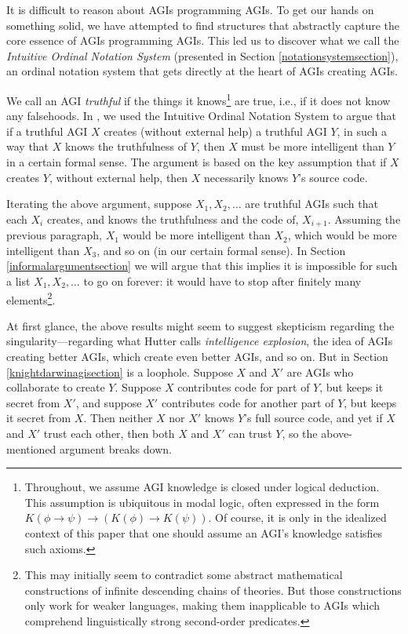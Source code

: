 \documentclass[runningheads]{llncs}
\begin{document}
It is difficult to reason about AGIs programming AGIs. To get our hands on something solid,
we have attempted to find structures that abstractly capture the core essence of
AGIs programming AGIs. This led us to discover
what we call the \emph{Intuitive Ordinal Notation System} (presented in Section
\ref{notationsystemsection}), an ordinal notation system that gets directly at
the heart of AGIs creating AGIs.

We call an AGI \emph{truthful} if the things it knows\footnote{Throughout, we assume
AGI knowledge is closed under logical
deduction. This assumption is ubiquitous in modal logic, often expressed in
the form
$K(\phi\rightarrow\psi)\rightarrow (K(\phi)\rightarrow K(\psi))$. Of course,
it is only in the idealized context of this paper that one should assume an AGI's
knowledge satisfies such axioms.}
are true,
i.e., if it does not know any falsehoods.
In \cite{alexander2019measuring}, we used the Intuitive Ordinal Notation System to argue
that if a truthful AGI $X$ creates (without external help) a truthful AGI $Y$, in such a way
that $X$ knows the truthfulness
of $Y$, then $X$ must be more intelligent than $Y$
in a certain formal sense. The argument is based on the key assumption that if $X$
creates $Y$, without external help, then $X$ necessarily knows $Y$'s source code.

Iterating the above argument, suppose $X_1,X_2,\ldots$
are truthful AGIs such that each $X_i$ creates, and knows the truthfulness and
the code of, $X_{i+1}$. Assuming the previous paragraph, $X_1$ would be more
intelligent than $X_2$, which would be more
intelligent than $X_3$, and so on (in our certain formal sense).
In Section \ref{informalargumentsection} we will argue that this implies
it is impossible for such
a list $X_1,X_2,\ldots$ to go on forever: it would have to stop after finitely
many elements\footnote{This may initially seem to contradict some abstract mathematical
constructions \cite{kripke2019ungroundedness}
\cite{visser2002semantics} of infinite descending chains of theories. But those
constructions only work for weaker languages, making them inapplicable to
AGIs which comprehend
linguistically strong second-order predicates.}.

At first glance, the above results might
seem to suggest skepticism regarding the singularity---regarding
what Hutter \cite{hutter2012} calls \emph{intelligence explosion}, the idea of
AGIs creating better AGIs, which create even better AGIs, and so on.
But in Section \ref{knightdarwinagisection} is a loophole. Suppose $X$ and $X'$ are AGIs
who collaborate to create $Y$. Suppose $X$ contributes code for
part of $Y$, but keeps it secret from $X'$, and suppose $X'$ contributes
code for another part of $Y$, but keeps it secret from $X$. Then neither
$X$ nor $X'$ knows $Y$'s full source code, and yet if $X$ and $X'$ trust
each other, then both $X$ and $X'$ can trust $Y$, so the above-mentioned
argument breaks down.
\end{document}

